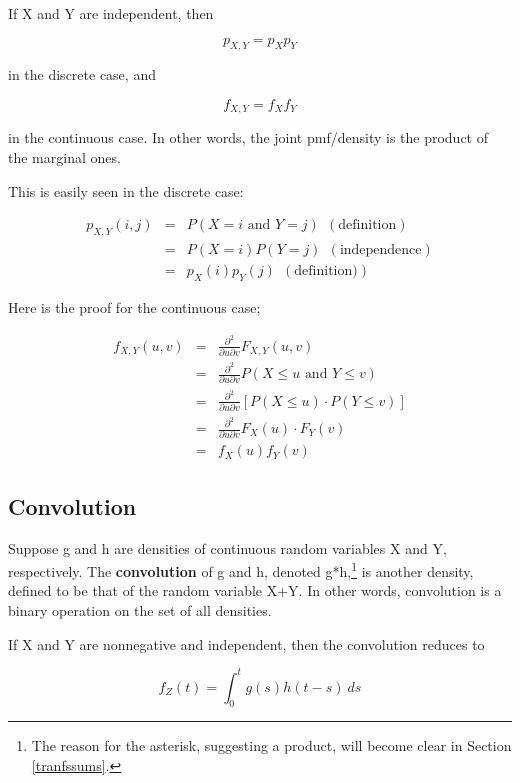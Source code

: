 If X and Y are independent, then 

\begin{equation}
\label{indeppmf}
p_{X,Y} = p_X p_Y
\end{equation}

in the discrete case, and 

\begin{equation}
\label{indepdens}
f_{X,Y} = f_X f_Y
\end{equation}

in the continuous case.  In other words, the joint pmf/density is the
product of the marginal ones.

This is easily seen in the discrete case:

\begin{eqnarray}
p_{X,Y}(i,j) 
&=& P(X = i \textrm{ and } Y = j) ~~ (\textrm{definition}) \\
&=& P(X = i) P(Y = j)  ~~ (\textrm{independence}) \\
&=& p_X(i) p_Y(j)  ~~ (\textrm{definition)})
\end{eqnarray}

Here is the proof for the continuous case; 

\begin{eqnarray}
f_{X,Y} (u,v) 
&=& \frac{\partial^2}{\partial u \partial v}
 F_{X,Y}(u,v) \\
&=& \frac{\partial^2}{\partial u \partial v}
 P(X \leq u
\textrm{ and } Y \leq v) \\
&=& \frac{\partial^2}{\partial u \partial v}
\left [ P(X \leq u)
\cdot P(Y \leq v) \right ] \\
&=& \frac{\partial^2}{\partial u \partial v}
 F_X(u) 
\cdot F_Y(v) \\
&=& f_X(u) f_Y(v)
\end{eqnarray}

\subsection{Convolution} 
\label{convolution}

\begin{definition}
Suppose g and h are densities of continuous random
variables X and Y, respectively.  The {\bf convolution} of g and h,
denoted g*h,\footnote{The reason for the asterisk, suggesting a product,
will become clear in Section \ref{tranfssums}.} is another density,
defined to be that of the random variable X+Y.  In other words,
convolution is a binary operation on the set of all densities.

If X and Y are nonnegative and independent, then the convolution reduces to 

\begin{equation}
\label{convcontin}
f_Z(t) = \int_{0}^t g(s) h(t-s) ~ ds
\end{equation}
\end{definition}

